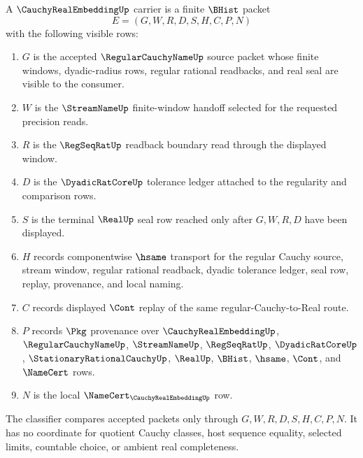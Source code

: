 \begin{definition}
\label{def:cauchy-real-embedding-carrier}
A $\CauchyRealEmbeddingUp$ carrier is a finite $\BHist$ packet
$$
E=(G,W,R,D,S,H,C,P,N)
$$
with the following visible rows:
\begin{enumerate}
\item $G$ is the accepted $\RegularCauchyNameUp$ source packet whose finite windows, dyadic-radius rows, regular rational readbacks, and real seal are visible to the consumer.
\item $W$ is the $\StreamNameUp$ finite-window handoff selected for the requested precision reads.
\item $R$ is the $\RegSeqRatUp$ readback boundary read through the displayed window.
\item $D$ is the $\DyadicRatCoreUp$ tolerance ledger attached to the regularity and comparison rows.
\item $S$ is the terminal $\RealUp$ seal row reached only after $G,W,R,D$ have been displayed.
\item $H$ records componentwise $\hsame$ transport for the regular Cauchy source, stream window, regular rational readback, dyadic tolerance ledger, seal row, replay, provenance, and local naming.
\item $C$ records displayed $\Cont$ replay of the same regular-Cauchy-to-Real route.
\item $P$ records $\Pkg$ provenance over $\CauchyRealEmbeddingUp$, $\RegularCauchyNameUp$, $\StreamNameUp$, $\RegSeqRatUp$, $\DyadicRatCoreUp$, $\StationaryRationalCauchyUp$, $\RealUp$, $\BHist$, $\hsame$, $\Cont$, and $\NameCert$ rows.
\item $N$ is the local $\NameCert_{\CauchyRealEmbeddingUp}$ row.
\end{enumerate}
The classifier compares accepted packets only through $G,W,R,D,S,H,C,P,N$. It has no coordinate for quotient Cauchy classes, host sequence equality, selected limits, countable choice, or ambient real completeness.
\end{definition}

